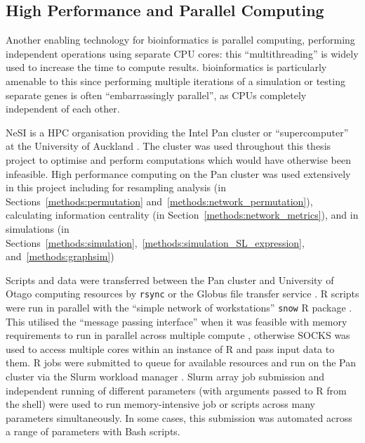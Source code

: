 
\subsection{High Performance and Parallel Computing} \label{methods:HPC}

Another enabling technology for \gls{bioinformatics} is parallel computing, performing independent operations using separate \gls{CPU} cores: this ``multithreading'' is widely used to increase the time to compute results. \Gls{bioinformatics} is particularly amenable to this since performing multiple iterations of a simulation or testing separate genes is often ``embarrassingly parallel'', as \glspl{CPU} completely independent of each other. %

\Gls{NeSI} is a \gls{HPC} organisation providing the Intel Pan cluster or ``supercomputer'' at the University of Auckland \citep{NeSI}. The cluster was used throughout this thesis project to optimise and perform computations which would have otherwise been infeasible. High performance computing on the Pan cluster was used extensively in this project including for resampling analysis (in Sections~\ref{methods:permutation} and~\ref{methods:network_permutation}), calculating \gls{information centrality} (in Section~\ref{methods:network_metrics}), and in simulations (in Sections~\ref{methods:simulation},~\ref{methods:simulation_SL_expression}, and~\ref{methods:graphsim})

Scripts and data were transferred between the Pan cluster and University of Otago computing resources by \texttt{rsync} or the Globus file transfer service \citep{Globus}. R scripts \citep{R_core} were run in parallel with the ``simple network of workstations'' \texttt{snow} R package \citet{snow}. This utilised the ``message passing interface'' \citep{Rmpi} when it was feasible with memory requirements to run in parallel across multiple compute , otherwise \gls{SOCKS} was used to access multiple cores within an instance of R and pass input data to them. R jobs were submitted to queue for available resources and run on the Pan cluster via the \gls{Slurm} workload manager \citep{slurm}.  \gls{Slurm} array job submission and independent running of different parameters (with arguments passed to R from the shell) were used to run memory-intensive job or scripts across many parameters simultaneously. In some cases, this submission was automated across a range of parameters with Bash scripts.

